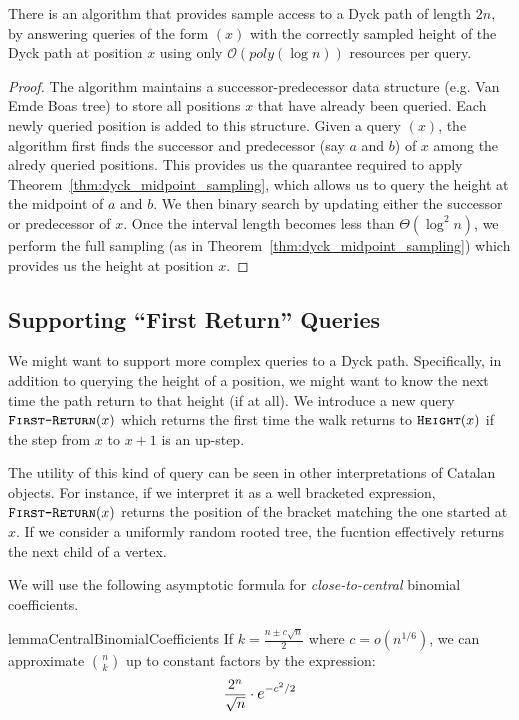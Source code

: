 \begin{theorem}
\label{thm:dyck_sampling}
There is an algorithm that provides sample access to a Dyck path of length $2n$,
by answering queries of the form $(x)$ with the correctly sampled height of the Dyck path at position $x$
using only $\mathcal O(poly(\log n))$ resources per query.
\end{theorem}
\begin{proof}
The algorithm maintains a successor-predecessor data structure (e.g. Van Emde Boas tree)
to store all positions $x$ that have already been queried.
Each newly queried position is added to this structure.
Given a query $(x)$, the algorithm first finds the successor and predecessor
(say $a$ and $b$) of $x$ among the alredy queried positions.
This provides us the quarantee required to apply Theorem~\ref{thm:dyck_midpoint_sampling},
which allows us to query the height at the midpoint of $a$ and $b$.
We then binary search by updating either the successor or predecessor of $x$.
Once the interval length becomes less than $\Theta(\log^2 n)$,
we perform the full sampling (as in Theorem~\ref{thm:dyck_midpoint_sampling}) which provides us the height at position $x$.
\end{proof}




\subsection{Supporting ``First Return'' Queries}%
\label{sec:supporting_first_return_queries}

We might want to support more complex queries to a Dyck path.
Specifically, in addition to querying the height of a position,
we might want to know the next time the path return to that height (if at all).
We introduce a new query $\texttt{\textsc{First-Return}}(x)$ which returns the first time the walk returns to
$\texttt{\textsc{Height}}(x)$ if the step from $x$ to $x+1$ is an up-step.

The utility of this kind of query can be seen in other interpretations of Catalan objects.
For instance, if we interpret it as a well bracketed expression,
$\texttt{\textsc{First-Return}}(x)$ returns the position of the bracket matching the one started at $x$.
If we consider a uniformly random rooted tree, the fucntion effectively returns the next child of a vertex.

We will use the following asymptotic formula for \emph{close-to-central} binomial coefficients.
\begin{restatable}{lemma}{CentralBinomialCoefficients}
\label{lem:CentralBinomialCoefficients}
If $k = \frac{n \pm c\sqrt n}{2}$ where $c = o(n^{1/6})$,
we can approximate $\binom{n}{k}$ up to constant factors by the expression:
\[
\frac{2^n}{\sqrt n}\cdot \mathlarger e^{-c^2/2}
\]
\end{restatable}

